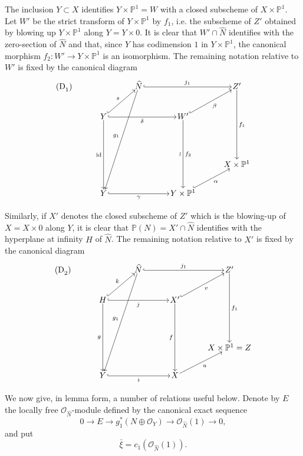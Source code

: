 \documentclass[11pt]{article}
\begin{document}
The inclusion $Y\subset X$ identifies $Y\times\mathbb P^1=W$ with a closed subscheme of $X\times\mathbb P^1$. Let $W'$ be the strict transform of $Y\times\mathbb P^1$ by $f_1$, i.e. the subscheme of $Z'$ obtained by blowing up $Y\times\mathbb P^1$ along $Y=Y\times0$. It is clear that $W'\cap\widehat N$ identifies with the zero-section of $\widehat N$ and that, since $Y$ has codimension $1$ in $Y\times\mathbb P^1$, the canonical morphism $f_2:W'\to Y\times\mathbb P^1$ is an isomorphism. The remaining notation relative to $W'$ is fixed by the canonical diagram
\[
\begin{tikzcd}[column sep=3.2em,row sep=2.4em,cells={nodes={inner sep=1pt}}]
\text{(D}_1\text{)}\arrow[from=1-3,to=5-2,"g_1"']
& & \widehat N \arrow[rr,hook,"j_1"] & & Z' \arrow[ddd,"f_1"] \\
& Y \arrow[ur,hook,"s"] \arrow[rr,hook,"\delta"'] \arrow[ddd,"\mathrm{id}"'] & &
W' \arrow[ur,hook,"\beta"'] \arrow[ddd,"\wr"',"f_2"] & \\
& & & & \\
& & & & X\times\mathbb P^1 \\
& Y \arrow[rr,hook,"\gamma"'] & & Y\times\mathbb P^1 \arrow[ur,hook,"\alpha"'] &
\end{tikzcd}
\]

Similarly, if $X'$ denotes the closed subscheme of $Z'$ which is the blowing-up of $X=X\times0$ along $Y$, it is clear that $\mathbb P(N)=X'\cap\widehat N$ identifies with the hyperplane at infinity $H$ of $\widehat N$. The remaining notation relative to $X'$ is fixed by the canonical diagram
\[
\begin{tikzcd}[column sep=3.2em,row sep=2.4em,cells={nodes={inner sep=1pt}}]
\text{(D}_2\text{)}\arrow[from=1-3,to=5-2,"g_1"']
& & \widehat N \arrow[rr,hook,"j_1"] & & Z' \arrow[ddd,"f_1"] \\
& H \arrow[ur,hook,"k"] \arrow[rr,hook,"j"'] \arrow[ddd,"g"'] & &
X' \arrow[ur,hook,"v"'] \arrow[ddd,"f"'] & \\
& & & & \\
& & & & X\times\mathbb P^1=Z \\
& Y \arrow[rr,hook,"i"'] & & X \arrow[ur,"u"'] &
\end{tikzcd}
\]

We now give, in lemma form, a number of relations useful below. Denote by $E$ the locally free $\mathcal O_{\widehat N}$-module defined by the canonical exact sequence
\[
0\to E\to g_1^*(N\oplus\mathcal O_Y)\to\mathcal O_{\widehat N}(1)\to0,
\tag{9.3.0}
\]
and put
\[
\bar\xi=c_1(\mathcal O_{\widehat N}(1)).
\tag{9.3.1}
\]
\end{document}
